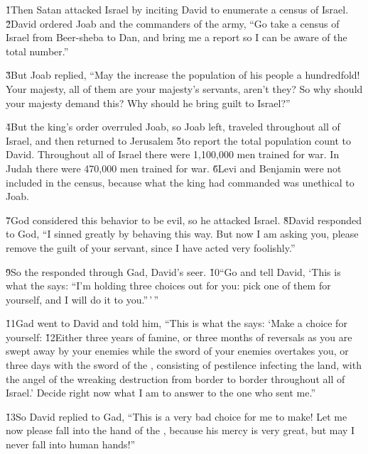 \v{1}Then Satan attacked Israel by inciting David to enumerate a census of Israel. \v{2}David ordered Joab and the commanders of the army, ``Go take a census of Israel from Beer-sheba to Dan, and bring me a report so I can be aware of the total number.''

\v{3}But Joab replied, ``May the  increase the population of his people a hundredfold! Your majesty, all of them are your majesty's servants, aren't they? So why should your majesty demand this? Why should he bring guilt to Israel?''

\v{4}But the king's order overruled Joab, so Joab left, traveled throughout all of Israel, and then returned to Jerusalem \v{5}to report the total population count to David. Throughout all of Israel there were 1,100,000 men trained for war. In Judah there were 470,000 men trained for war. \v{6}Levi and Benjamin were not included in the census, because what the king had commanded was unethical to Joab.

\v{7}God considered this behavior to be evil, so he attacked Israel. \v{8}David responded to God, ``I sinned greatly by behaving this way. But now I am asking you, please remove the guilt of your servant, since I have acted very foolishly.''

\v{9}So the  responded through Gad, David's seer. \v{10}``Go and tell David, `This is what the  says: ``I'm holding three choices out for you: pick one of them for yourself, and I will do it to you.''\,'\,''

\v{11}Gad went to David and told him, ``This is what the  says: `Make a choice for yourself: \v{12}Either three years of famine, or three months of reversals as you are swept away by your enemies while the sword of your enemies overtakes you, or three days with the sword of the , consisting of pestilence infecting the land, with the angel of the  wreaking destruction from border to border throughout all of Israel.' Decide right now what I am to answer to the one who sent me.''

\v{13}So David replied to Gad, ``This is a very bad choice for me to make! Let me now please fall into the hand of the , because his mercy is very great, but may I never fall into human hands!''

